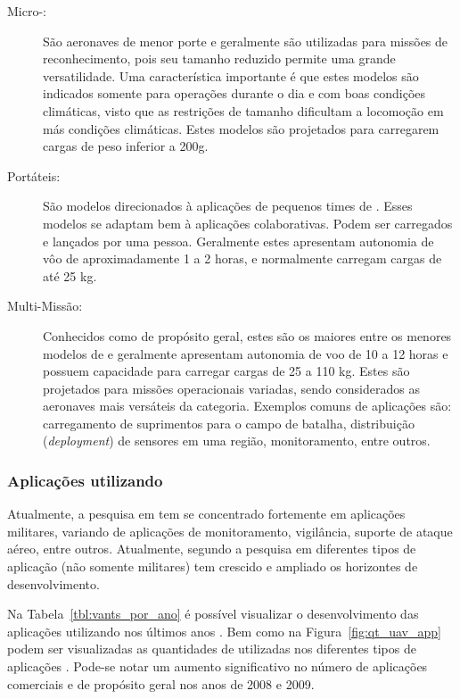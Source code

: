 \begin{description}

\item[Micro-\vants: ]
São aeronaves de menor porte e geralmente são utilizadas para missões de reconhecimento, pois seu tamanho reduzido permite uma grande versatilidade. Uma característica importante é que estes modelos são indicados somente para operações durante o dia e com boas condições climáticas, visto que as restrições de tamanho dificultam a locomoção em más condições climáticas. Estes modelos são projetados para carregarem cargas de peso inferior a 200g.

\item[Portáteis: ]
São modelos direcionados à aplicações de pequenos times de \vants. Esses modelos se adaptam bem à aplicações colaborativas. Podem ser carregados e lançados por uma pessoa. Geralmente estes \vants apresentam autonomia de vôo de aproximadamente 1 a 2 horas, e normalmente carregam cargas de até 25 kg.

\item[Multi-Missão: ]
Conhecidos como \vants  de propósito geral, estes são os maiores entre os menores modelos de \vants e geralmente apresentam autonomia de voo de 10 a 12 horas e possuem capacidade para carregar cargas de 25 a 110 kg. Estes \vants são projetados para missões operacionais variadas, sendo considerados as aeronaves mais versáteis da categoria. Exemplos comuns de aplicações são: carregamento de suprimentos para o campo de batalha, distribuição (\emph{deployment}) de sensores em uma região, monitoramento, entre outros.

\end{description}


\subsubsection{Aplicações utilizando \vants}
Atualmente, a pesquisa em \vants tem se concentrado fortemente em aplicações militares, variando de aplicações de monitoramento, vigilância, suporte de ataque aéreo, entre outros. Atualmente, segundo \cite{Valavanis2007} a pesquisa em diferentes tipos de aplicação (não somente militares) tem crescido e ampliado os horizontes de desenvolvimento.

Na Tabela~\ref{tbl:vants_por_ano} é possível visualizar o desenvolvimento das aplicações utilizando \vants nos últimos anos \cite{Bryner2007}. Bem como na Figura~\ref{fig:qt_uav_app} podem ser visualizadas as quantidades de \vants utilizadas nos diferentes tipos de aplicações \cite{Bryner2007}. Pode-se notar um aumento significativo no número de aplicações comerciais e de propósito geral nos anos de 2008 e 2009.


